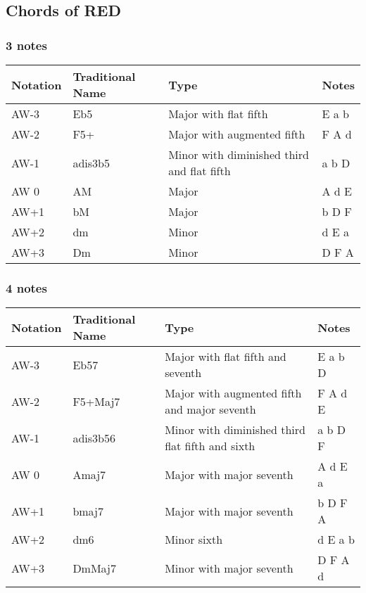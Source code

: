 \documentclass[]{report}
\begin{document}
\subsection*{Chords of RED}
\subsubsection*{3 notes}
\begin{table}[H]
\centering
\begin{tabularx}{\textwidth}{ll>{\raggedright\arraybackslash}Xl}
\toprule
Notation & Traditional Name & Type & Notes \\
\midrule
\textsf{AW-3} & Eb5 & Major with flat fifth & E a b \\
\textsf{AW-2} & F5+ & Major with augmented fifth & F A d \\
\textsf{AW-1} & adis3b5 & Minor with diminished third and flat fifth & a b D \\
\textsf{AW 0} & AM & Major & A d E \\
\textsf{AW+1} & bM & Major & b D F \\
\textsf{AW+2} & dm & Minor & d E a \\
\textsf{AW+3} & Dm & Minor & D F A \\
\bottomrule
\end{tabularx}
\end{table}
\subsubsection*{4 notes}
\begin{table}[H]
\centering
\begin{tabularx}{\textwidth}{ll>{\raggedright\arraybackslash}Xl}
\toprule
Notation & Traditional Name & Type & Notes \\
\midrule
\textsf{AW-3} & Eb57 & Major with flat fifth and seventh & E a b D \\
\textsf{AW-2} & F5+Maj7 & Major with augmented fifth and major seventh & F A d E \\
\textsf{AW-1} & adis3b56 & Minor with diminished third flat fifth and sixth & a b D F \\
\textsf{AW 0} & Amaj7 & Major with major seventh & A d E a \\
\textsf{AW+1} & bmaj7 & Major with major seventh & b D F A \\
\textsf{AW+2} & dm6 & Minor sixth & d E a b \\
\textsf{AW+3} & DmMaj7 & Minor with major seventh & D F A d \\
\bottomrule
\end{tabularx}
\end{table}
\end{document}
